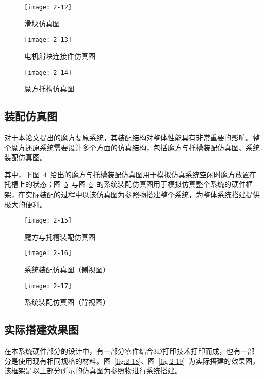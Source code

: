 \begin{figure}[H]
	\centering
	\texttt{[image: 2-12]}
	\caption{滑块仿真图}\label{fig:2-12}
\end{figure}


\begin{figure}[H]
	\centering
	\texttt{[image: 2-13]}
	\caption{电机滑块连接件仿真图}\label{fig:2-13}
\end{figure}


\begin{figure}[H]
\centering
\texttt{[image: 2-14]}
\caption{魔方托槽仿真图}\label{fig:2-14}
\end{figure}

\subsection{装配仿真图}

对于本论文提出的魔方复原系统，其装配结构对整体性能具有非常重要的影响。整个魔方还原系统需要设计多个方面的仿真结构，包括魔方与托槽装配仿真图、系统装配仿真图。

其中，下图~\ref{fig:2-15}~给出的魔方与托槽装配仿真图用于模拟仿真系统空闲时魔方放置在托槽上的状态；图~\ref{fig:2-16}~与图~\ref{fig:2-17}~的系统装配仿真图用于模拟仿真整个系统的硬件框架，在实际装配的过程中以该仿真图为参照物搭建整个系统，为整体系统搭建提供极大的便利。

\begin{figure}[H]
	\centering
	\texttt{[image: 2-15]}
	\caption{魔方与托槽装配仿真图}\label{fig:2-15}
\end{figure}

\begin{figure}[H]
	\centering
	\texttt{[image: 2-16]}
	\caption{系统装配仿真图（侧视图）}\label{fig:2-16}
\end{figure}

\begin{figure}[H]
	\centering
	\texttt{[image: 2-17]}
	\caption{系统装配仿真图（背视图）}\label{fig:2-17}
\end{figure}

\subsection{实际搭建效果图}

在本系统硬件部分的设计中，有一部分零件结合3D打印技术打印而成，也有一部分是使用现有相同规格的材料。图~\ref{fig:2-18}、图~\ref{fig:2-19}~为实际搭建的效果图，该框架是以上部分所示的仿真图为参照物进行系统搭建。

